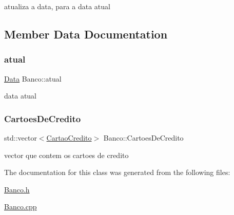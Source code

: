 atualiza a data, para a data atual 



\subsection{Member Data Documentation}
\mbox{\label{class_banco_a8a183cd204373487207a7a7f2e8298ba}} 
\subsubsection{\texorpdfstring{atual}{atual}}
{\footnotesize\ttfamily \mbox{\hyperlink{class_data}{Data}} Banco\+::atual\hspace{0.3cm}{\ttfamily [private]}}

data atual \mbox{\label{class_banco_a45e7c51b2a5e58a357367a49eabd15e5}} 
\subsubsection{\texorpdfstring{Cartoes\+De\+Credito}{CartoesDeCredito}}
{\footnotesize\ttfamily std\+::vector$<$\mbox{\hyperlink{class_cartao_credito}{Cartao\+Credito}}$>$ Banco\+::\+Cartoes\+De\+Credito\hspace{0.3cm}{\ttfamily [private]}}

vector que contem os cartoes de credito 

The documentation for this class was generated from the following files\+:\begin{DoxyCompactItemize}
\item 
\mbox{\hyperlink{_banco_8h}{Banco.\+h}}\item 
\mbox{\hyperlink{_banco_8cpp}{Banco.\+cpp}}\end{DoxyCompactItemize}
